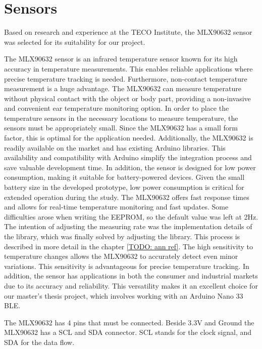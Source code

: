 
\section{Sensors}
\label{ch:Design:Prototype:Sensors}

Based on research and experience at the TECO Institute, the MLX90632 sensor was selected for its suitability for our project.

The MLX90632 sensor is an infrared temperature sensor known for its high accuracy in temperature measurements. This enables reliable applications where precise temperature tracking is needed.
Furthermore, non-contact temperature measurement is a huge advantage. 
The MLX90632 can measure temperature without physical contact with the object or body part, providing a non-invasive and convenient ear temperature monitoring option.
In order to place the temperature sensors in the necessary locations to measure temperature, the sensors must be appropriately small. 
Since the MLX90632 has a small form factor, this is optimal for the application needed.
Additionally, the MLX90632 is readily available on the market and has existing Arduino libraries. 
This availability and compatibility with Arduino simplify the integration process and save valuable development time.
In addition, the sensor is designed for low power consumption, making it suitable for battery-powered devices. 
Given the small battery size in the developed prototype, low power consumption is critical for extended operation during the study.
The MLX90632 offers fast response times and allows for real-time temperature monitoring and fast updates. 
Some difficulties arose when writing the EEPROM, so the default value was left at 2Hz.
The intention of adjusting the measuring rate was the implementation details of the library, which was finally solved by adjusting the library. 
This process is described in more detail in the chapter \ref{TODO: ann ref}.
The high sensitivity to temperature changes allows the MLX90632 to accurately detect even minor variations. This sensitivity is advantageous for precise temperature tracking.
In addition, the sensor has applications in both the consumer and industrial markets due to its accuracy and reliability. This versatility makes it an excellent choice for our master's thesis project, which involves working with an Arduino Nano 33 BLE.

The MLX90632 has 4 pins that must be connected. Beside 3.3V and Ground the MLX90632 has a SCL and SDA connector. SCL stands for the clock signal, and SDA for the data flow.

